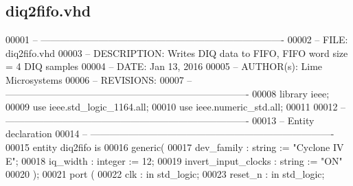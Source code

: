 \subsection{diq2fifo.\+vhd}
\label{diq2fifo_8vhd_source}

\begin{DoxyCode}
00001 \textcolor{keyword}{-- ---------------------------------------------------------------------------- }
00002 \textcolor{keyword}{-- FILE:    diq2fifo.vhd}
00003 \textcolor{keyword}{-- DESCRIPTION:   Writes DIQ data to FIFO, FIFO word size = 4  DIQ samples }
00004 \textcolor{keyword}{-- DATE: Jan 13, 2016}
00005 \textcolor{keyword}{-- AUTHOR(s): Lime Microsystems}
00006 \textcolor{keyword}{-- REVISIONS:}
00007 \textcolor{keyword}{-- ---------------------------------------------------------------------------- }
00008 \textcolor{vhdlkeyword}{library }\textcolor{keywordflow}{ieee};
00009 \textcolor{vhdlkeyword}{use }ieee.std\_logic\_1164.\textcolor{keywordflow}{all};
00010 \textcolor{vhdlkeyword}{use }ieee.numeric\_std.\textcolor{keywordflow}{all};
00011 
00012 \textcolor{keyword}{-- ----------------------------------------------------------------------------}
00013 \textcolor{keyword}{-- Entity declaration}
00014 \textcolor{keyword}{-- ----------------------------------------------------------------------------}
00015 \textcolor{keywordflow}{entity }diq2fifo \textcolor{keywordflow}{is}
00016    \textcolor{keywordflow}{generic}\textcolor{vhdlchar}{(} 
00017       \textcolor{vhdlchar}{dev_family}           \textcolor{vhdlchar}{:} \textcolor{comment}{string} \textcolor{vhdlchar}{:=} \textcolor{keyword}{"Cyclone IV E"};
00018       \textcolor{vhdlchar}{iq_width}             \textcolor{vhdlchar}{:} \textcolor{comment}{integer} \textcolor{vhdlchar}{:=} \textcolor{vhdllogic}{}\textcolor{vhdllogic}{12};
00019       \textcolor{vhdlchar}{invert_input_clocks}  \textcolor{vhdlchar}{:} \textcolor{comment}{string} \textcolor{vhdlchar}{:=} \textcolor{keyword}{"ON"}
00020       \textcolor{vhdlchar}{)};
00021    \textcolor{keywordflow}{port} \textcolor{vhdlchar}{(}
00022       \textcolor{vhdlchar}{clk}            \textcolor{vhdlchar}{:} \textcolor{keywordflow}{in} \textcolor{comment}{std\_logic};
00023       \textcolor{vhdlchar}{reset_n}        \textcolor{vhdlchar}{:} \textcolor{keywordflow}{in} \textcolor{comment}{std\_logic};

\end{DoxyCode}
